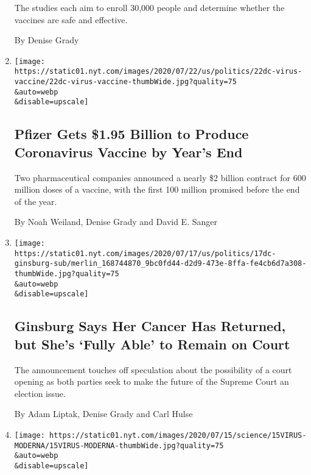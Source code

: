\begin{enumerate}
  The studies each aim to enroll 30,000 people and determine whether the
  vaccines are safe and effective.

  By Denise Grady
\item
  \href{/2020/07/22/us/politics/pfizer-coronavirus-vaccine.html}{}

  \texttt{[image: https://static01.nyt.com/images/2020/07/22/us/politics/22dc-virus-vaccine/22dc-virus-vaccine-thumbWide.jpg?quality=75\\\&auto=webp\\\&disable=upscale]}

  \hypertarget{pfizer-gets-195-billion-to-produce-coronavirus-vaccine-by-years-end}{%
  \subsection{Pfizer Gets \$1.95 Billion to Produce Coronavirus Vaccine
  by Year's
  End}\label{pfizer-gets-195-billion-to-produce-coronavirus-vaccine-by-years-end}}

  Two pharmaceutical companies announced a nearly \$2 billion contract
  for 600 million doses of a vaccine, with the first 100 million
  promised before the end of the year.

  By Noah Weiland, Denise Grady and David E. Sanger
\item
  \href{/2020/07/17/us/justice-ruth-bader-ginsburg-cancer.html}{}

  \texttt{[image: https://static01.nyt.com/images/2020/07/17/us/politics/17dc-ginsburg-sub/merlin\_168744870\_9bc0fd44-d2d9-473e-8ffa-fe4cb6d7a308-thumbWide.jpg?quality=75\\\&auto=webp\\\&disable=upscale]}

  \hypertarget{ginsburg-says-her-cancer-has-returned-but-shes-fully-able-to-remain-on-court}{%
  \subsection{Ginsburg Says Her Cancer Has Returned, but She's `Fully
  Able' to Remain on
  Court}\label{ginsburg-says-her-cancer-has-returned-but-shes-fully-able-to-remain-on-court}}

  The announcement touches off speculation about the possibility of a
  court opening as both parties seek to make the future of the Supreme
  Court an election issue.

  By Adam Liptak, Denise Grady and Carl Hulse
\item
  \href{/2020/07/14/health/cornavirus-vaccine-moderna.html}{}

  \texttt{[image: https://static01.nyt.com/images/2020/07/15/science/15VIRUS-MODERNA/15VIRUS-MODERNA-thumbWide.jpg?quality=75\\\&auto=webp\\\&disable=upscale]}


\end{enumerate}
